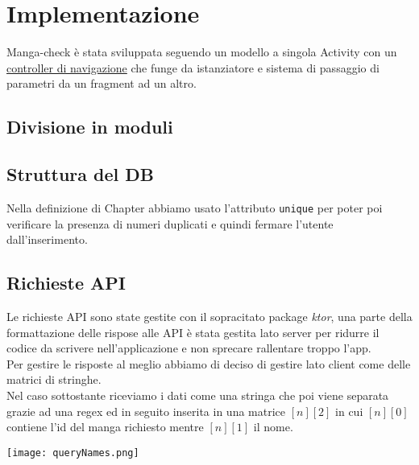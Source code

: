 \documentclass[../Assignment-3-LPSMT.tex]{subfiles}
\begin{document}
\chapter{Implementazione}

Manga-check è stata sviluppata seguendo un modello a singola Activity con un
\href{https://developer.android.com/guide/navigation}{controller di navigazione}
che funge da istanziatore e sistema di passaggio di parametri da un fragment ad un altro.\\

\section{Divisione in moduli}

\section{Struttura del DB}





Nella definizione di Chapter abbiamo usato l'attributo \texttt{unique} per poter poi verificare la presenza di numeri duplicati e quindi fermare l'utente dall'inserimento.

\section{Richieste API}

Le richieste API sono state gestite con il sopracitato package \emph{ktor}, una parte della formattazione delle rispose alle API è stata gestita lato server per ridurre il codice da scrivere nell'applicazione e non sprecare rallentare troppo l'app.\\
Per gestire le risposte al meglio abbiamo di deciso di gestire lato client come delle matrici di stringhe.\\
Nel caso sottostante riceviamo i dati come una stringa che poi viene separata grazie ad una regex ed in seguito inserita in una matrice $[n][2]$ in cui $[n][0]$ contiene l'id del manga richiesto mentre $[n][1]$ il nome.

\begin{center}
  \texttt{[image: queryNames.png]}
\end{center}
\end{document}
